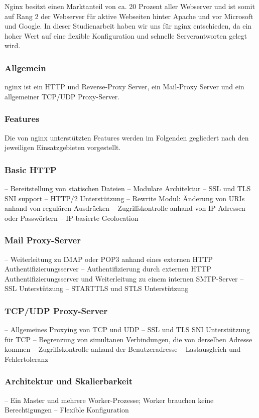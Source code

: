 Nginx besitzt einen Marktanteil von ca. 20 Prozent aller Webserver und ist somit auf Rang 2 der Webserver für aktive Webseiten hinter Apache und vor Microsoft und Google\cite{.k}. In dieser Studienarbeit haben wir uns für nginx entschieden, da ein hoher Wert auf eine flexible Konfiguration und schnelle Serverantworten gelegt wird.

\subsubsection{Allgemein}
\label{sec:NginxAllgemein}

nginx ist ein HTTP und Reverse-Proxy Server, ein Mail-Proxy Server und ein allgemeiner TCP/UDP Proxy-Server.


\subsubsection{Features}
\label{sec:NginxFeatures}
Die von nginx unterstützten Features werden im Folgenden gegliedert nach den jeweiligen Einsatzgebieten vorgestellt.\cite{.14.03.2017}

\subsubsection{Basic HTTP}
\label{sec:NginxBasicHTTP}
–	Bereitstellung von statischen Dateien
–	Modulare Architektur
–	SSL und TLS SNI support
–	HTTP/2 Unterstützung
–	Rewrite Modul: Änderung von URIs anhand von regulären Ausdrücken
–	Zugriffskontrolle anhand von IP-Adressen oder Passwörtern
–	IP-basierte Geolocation

\subsubsection{Mail Proxy-Server}
\label{sec:NginxMail Proxy-Server}
–	Weiterleitung zu IMAP oder POP3 anhand eines externen HTTP Authentifizierungsserver
–	Authentifizierung durch externen HTTP Authentifizierungsserver und Weiterleitung zu einem internen SMTP-Server
–	SSL Unterstützung
–	STARTTLS und STLS Unterstützung

\subsubsection{TCP/UDP Proxy-Server}
\label{sec:NginxTCP/UDP Proxy-Server}
–	Allgemeines Proxying von TCP und UDP
–	SSL und TLS SNI Unterstützung für TCP
–	Begrenzung von simultanen Verbindungen, die von derselben Adresse kommen
–	Zugriffskontrolle anhand der Benutzeradresse
–	Lastausgleich und Fehlertoleranz

\subsubsection{Architektur und Skalierbarkeit}
\label{sec:NginxArchitektur und Skalierbarkeit}
–	Ein Master und mehrere Worker-Prozesse; Worker brauchen keine Berechtigungen
–	Flexible Konfiguration
